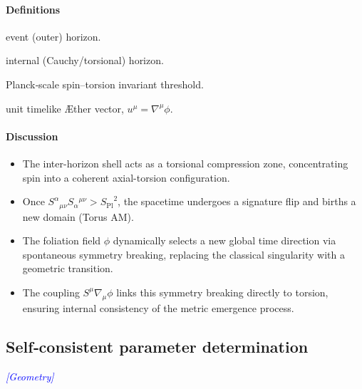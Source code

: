 \documentclass{article}
\newcommand{\Splanck}{\ensuremath{S_{\mathrm{Pl}}}}
\newcommand{\geometrytag}{\textcolor{blue}{\textit{[Geometry]}}}
\begin{document}
\paragraph{Definitions}
\begin{description}[leftmargin=2em]
  \item[$r_+$] event (outer) horizon.
  \item[$r_-$] internal (Cauchy/torsional) horizon.
  \item[$S^2 \sim \Splanck^2$] Planck‐scale spin–torsion invariant threshold.
  \item[$u_\mu$] unit timelike Æther vector, $u^\mu = \nabla^\mu \phi$.
\end{description}

\paragraph{Discussion}
\begin{itemize}[leftmargin=*]
  \item The inter-horizon shell acts as a torsional compression zone, concentrating spin into a coherent axial-torsion configuration.
  \item Once $S^\alpha{}_{\mu\nu} S_\alpha{}^{\mu\nu} > \Splanck^2$, the spacetime undergoes a signature flip and births a new domain (Torus AM).
  \item The foliation field $\phi$ dynamically selects a new global time direction via spontaneous symmetry breaking, replacing the classical singularity with a geometric transition.
  \item The coupling $S^\mu \nabla_\mu \phi$ links this symmetry breaking directly to torsion, ensuring internal consistency of the metric emergence process.
\end{itemize}





\subsection{Self‐consistent parameter determination}
\label{sec:param}
\geometrytag


\medskip
\begin{center}
\end{center}
\medskip
\end{document}
